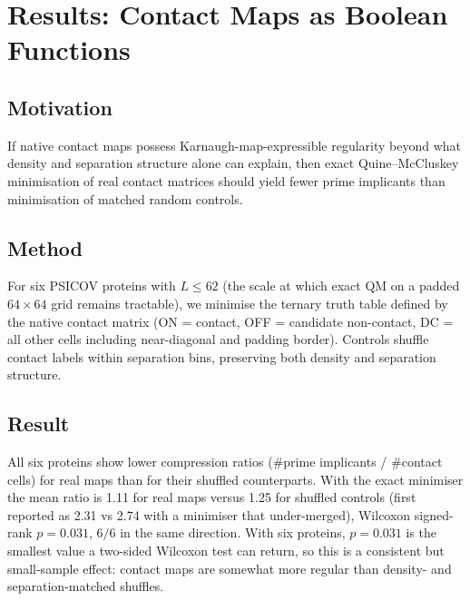 \section{Results: Contact Maps as Boolean Functions}
\label{sec:results-compressibility}

\subsection{Motivation}
If native contact maps possess Karnaugh-map-expressible regularity beyond what
density and separation structure alone can explain, then exact
Quine--McCluskey minimisation of real contact matrices should yield fewer
prime implicants than minimisation of matched random controls.

\subsection{Method}
For six PSICOV proteins with $L \leq 62$ (the scale at which exact QM on a
padded $64 \times 64$ grid remains tractable), we minimise the ternary truth
table defined by the native contact matrix (ON = contact, OFF = candidate
non-contact, DC = all other cells including near-diagonal and padding border).
Controls shuffle contact labels within separation bins, preserving both density
and separation structure.

\subsection{Result}
All six proteins show lower compression ratios (#prime implicants / #contact
cells) for real maps than for their shuffled counterparts.  With the exact
minimiser the mean ratio is 1.11 for real maps versus 1.25 for shuffled
controls (first reported as 2.31 vs 2.74 with a minimiser that under-merged),
Wilcoxon signed-rank $p = 0.031$, $6/6$ in the same direction.  With six
proteins, $p = 0.031$ is the smallest value a two-sided Wilcoxon test can
return, so this is a consistent but small-sample effect: contact maps are
somewhat more regular than density- and separation-matched shuffles.
